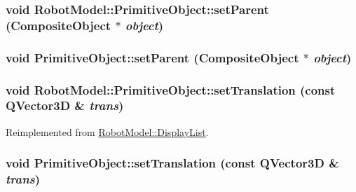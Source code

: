 \label{class_robot_model_1_1_primitive_object_a61c7cffdac933e1f363fa7d4715f669c}
\hypertarget{class_robot_model_1_1_primitive_object_a9097dd663246a16af3da8a4b193e6c14}{
\subsubsection[{setParent}]{\setlength{\rightskip}{0pt plus 5cm}void RobotModel::PrimitiveObject::setParent ({\bf CompositeObject} $\ast$ {\em object})}}
\label{class_robot_model_1_1_primitive_object_a9097dd663246a16af3da8a4b193e6c14}
\hypertarget{class_robot_model_1_1_primitive_object_afdcf8007d5aebfa88356d5551afb9775}{
\subsubsection[{setParent}]{\setlength{\rightskip}{0pt plus 5cm}void PrimitiveObject::setParent ({\bf CompositeObject} $\ast$ {\em object})}}
\label{class_robot_model_1_1_primitive_object_afdcf8007d5aebfa88356d5551afb9775}
\hypertarget{class_robot_model_1_1_primitive_object_a58f3d8655dd442ee1032f3582027604a}{
\subsubsection[{setTranslation}]{\setlength{\rightskip}{0pt plus 5cm}void RobotModel::PrimitiveObject::setTranslation (const QVector3D \& {\em trans})}}
\label{class_robot_model_1_1_primitive_object_a58f3d8655dd442ee1032f3582027604a}


Reimplemented from \hyperlink{class_robot_model_1_1_display_list_a6c9c1298e237ab25037ad9d7163b118c}{RobotModel::DisplayList}.\hypertarget{class_robot_model_1_1_primitive_object_ae6c417003b52df18a52711031e95c44a}{
\subsubsection[{setTranslation}]{\setlength{\rightskip}{0pt plus 5cm}void PrimitiveObject::setTranslation (const QVector3D \& {\em trans})}}
\label{class_robot_model_1_1_primitive_object_ae6c417003b52df18a52711031e95c44a}


